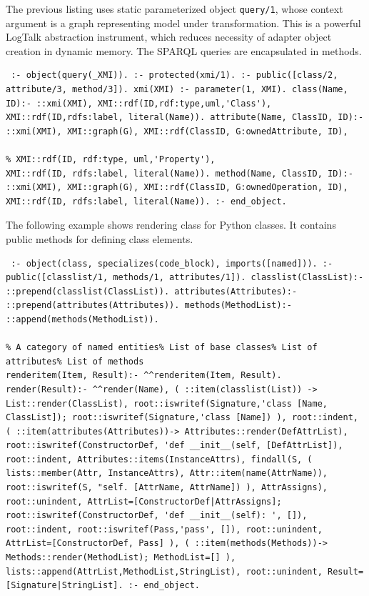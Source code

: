 \documentclass[conference]{IEEEtran} \IEEEoverridecommandlockouts
\begin{document}
The previous listing uses static parameterized object \verb|query/1|, whose context argument is a graph representing model under transformation. This is a powerful LogTalk abstraction instrument, which reduces necessity of adapter object creation in dynamic memory. The SPARQL queries are encapsulated in methods. 

\begin{verbatim} :- object(query(_XMI)). :- protected(xmi/1). :- public([class/2, attribute/3, method/3]). xmi(XMI) :- parameter(1, XMI). class(Name, ID):- ::xmi(XMI), XMI::rdf(ID,rdf:type,uml,'Class'), XMI::rdf(ID,rdfs:label, literal(Name)). attribute(Name, ClassID, ID):- ::xmi(XMI), XMI::graph(G), XMI::rdf(ClassID, G:ownedAttribute, ID), 

% XMI::rdf(ID, rdf:type, uml,'Property'),
XMI::rdf(ID, rdfs:label, literal(Name)). method(Name, ClassID, ID):- ::xmi(XMI), XMI::graph(G), XMI::rdf(ClassID, G:ownedOperation, ID), XMI::rdf(ID, rdfs:label, literal(Name)). :- end_object. \end{verbatim} 

The following example shows rendering class for Python classes. It contains public methods for defining class elements. 

\begin{verbatim} :- object(class, specializes(code_block), imports([named])). :- public([classlist/1, methods/1, attributes/1]). classlist(ClassList):- ::prepend(classlist(ClassList)). attributes(Attributes):- ::prepend(attributes(Attributes)). methods(MethodList):- ::append(methods(MethodList)). 

% A category of named entities% List of base classes% List of attributes% List of methods
renderitem(Item, Result):- ^^renderitem(Item, Result). render(Result):- ^^render(Name), ( ::item(classlist(List)) -> List::render(ClassList), root::iswritef(Signature,'class [Name, ClassList]); root::iswritef(Signature,'class [Name]) ), root::indent, ( ::item(attributes(Attributes))-> Attributes::render(DefAttrList), root::iswritef(ConstructorDef, 'def __init__(self, [DefAttrList]), root::indent, Attributes::items(InstanceAttrs), findall(S, ( lists::member(Attr, InstanceAttrs), Attr::item(name(AttrName)), root::iswritef(S, "self. [AttrName, AttrName]) ), AttrAssigns), root::unindent, AttrList=[ConstructorDef|AttrAssigns]; root::iswritef(ConstructorDef, 'def __init__(self): ', []), root::indent, root::iswritef(Pass,'pass', []), root::unindent, AttrList=[ConstructorDef, Pass] ), ( ::item(methods(Methods))-> Methods::render(MethodList); MethodList=[] ), lists::append(AttrList,MethodList,StringList), root::unindent, Result=[Signature|StringList]. :- end_object. \end{verbatim} 
\end{document}
